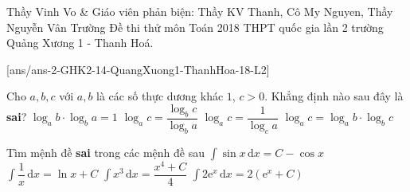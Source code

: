 \begin{name}
{Thầy Vinh Vo \& Giáo viên phản biện: Thầy KV Thanh, Cô My Nguyen, Thầy Nguyễn Vân Trường}
{Đề thi thử môn Toán  2018 THPT quốc gia lần 2 trường Quảng Xương 1 - Thanh Hoá.	}
\end{name}
\setcounter{ex}{0}\setcounter{bt}{0}
[ans/ans-2-GHK2-14-QuangXuong1-ThanhHoa-18-L2]
\begin{ex}
Cho $ a, b, c $ với $ a, b $ là các số thực dương khác $ 1 $, $ c > 0 $. Khẳng định nào sau đây là \textbf{sai}?	
	\choice
	{ $ \log_a b \cdot \log_b a = 1 $}
	{$ \log_a c = \dfrac{\log_b c}{\log_b a} $}
	{\True $ \log_a c = \dfrac{1}{\log_c a} $}
	{$ \log_a c = \log_a b \cdot \log_b c $}
\end{ex}	
\begin{ex}
Tìm mệnh đề \textbf{sai} trong các mệnh đề sau	
	\choice
	{$\displaystyle \int \sin x \mathrm{\, d}x = C - \cos x$}
	{\True $\displaystyle \int \dfrac{1}{x} \mathrm{\, d}x = \ln x + C $}
	{$\displaystyle \int x^3 \mathrm{\, d}x = \dfrac{x^4 + C}{4} $}
	{$\displaystyle \int 2 \mathrm{e}^x \mathrm{\, d}x = 2( \mathrm{e}^x + C ) $}
\end{ex}	
